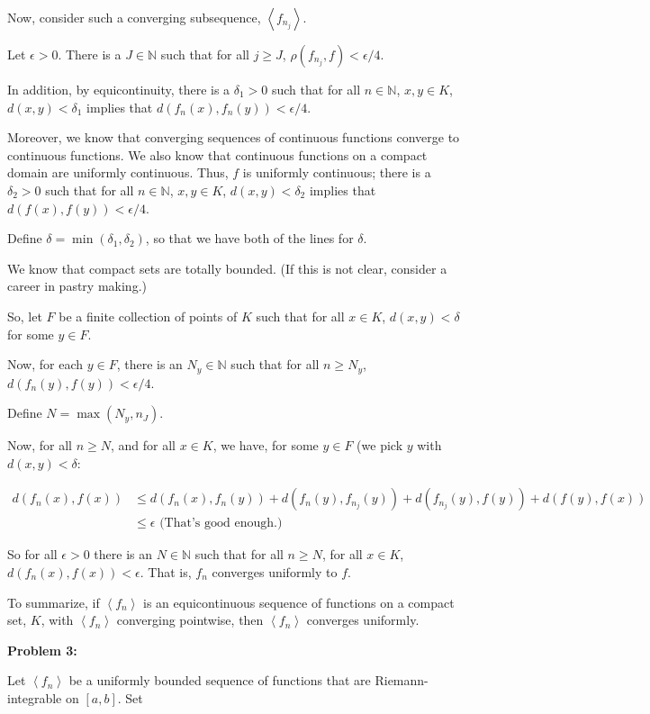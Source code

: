 \documentclass[a4paper,12pt]{article}
\newcommand{\tab}{\hspace{4mm}} %
\newcommand{\shunt}{\vspace{20mm}}
\newcommand{\anbrack}[1]{\left\langle #1 \right\rangle}
\newcommand{\de}{\delta}
\newcommand{\ep}{\epsilon}
\newcommand{\rh}{\rho}
\newcommand{\N}{\mathbb{N}}
\begin{document}
Now, consider such a converging subsequence, $\anbrack{f_{n_j}}$.

\tab Let $\ep >0$. There is a $J \in \N$ such that for all $j \geq J$, $\rh(f_{n_j}, f) < \ep/4$.

\tab In addition, by equicontinuity, there is a $\de_1 >0$ such that for all $n \in \N$, $x,y \in K$, $d(x,y) < \de_1$ implies that $d(f_n(x),f_n(y)) < \ep/4$.

\tab Moreover, we know that converging sequences of continuous functions converge to continuous functions. We also know that continuous functions on a compact domain are uniformly continuous. Thus, $f$ is uniformly continuous; there is a $\de_2 >0$ such that for all $n \in \N$, $x,y \in K$, $d(x,y) < \de_2$ implies that $d(f(x),f(y)) < \ep/4$.

\tab Define $\de = \min(\de_1,\de_2)$, so that we have both of the lines for $\de$.

\tab We know that compact sets are totally bounded. (If this is not clear, consider a career in pastry making.)

\tab So, let $F$ be a finite collection of points of $K$ such that for all $x \in K$, $d(x,y) < \de$ for some $y \in F$.

\tab Now, for each $y \in F$, there is an $N_y \in \N$ such that for all $n \geq N_y$, $d(f_n(y),f(y)) < \ep/4$. 

\tab Define $N = \max(N_y,n_J)$. 

\tab Now, for all $n \geq N$, and for all $x \in K$, we have, for some $y \in F$ (we pick $y$ with $d(x,y) < \de$: 

\begin{align*}
d(f_n(x),f(x)) &\leq d(f_n(x),f_n(y)) + d(f_n(y),f_{n_j}(y)) + d(f_{n_j}(y), f(y)) + d(f(y),f(x)) \\
&\leq \ep \text{ (That's good enough.)}
\end{align*}

So for all $\ep >0$ there is an $N \in \N$ such that for all $n \geq N$, for all $x \in K$, $d(f_n(x),f(x)) < \ep$. That is, $f_n$ converges uniformly to $f$.

To summarize, if $\anbrack{f_n}$ is an equicontinuous sequence of functions on a compact set, $K$, with $\anbrack{f_n}$ converging pointwise, then $\anbrack{f_n}$ converges uniformly.

\shunt

{\bf Problem 3:}

Let $\anbrack{f_n}$ be a uniformly bounded sequence of functions that are Riemann-integrable on $[a,b]$. Set
\end{document}
